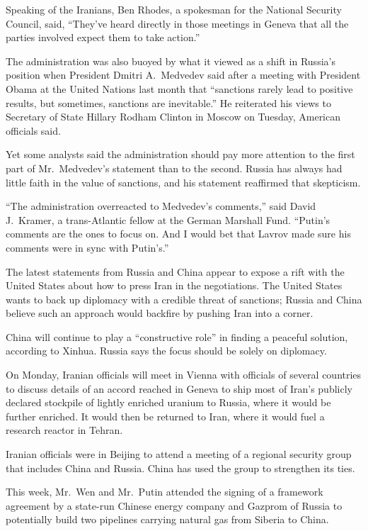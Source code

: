 ﻿\documentclass[12pt]{article}
\begin{document}
Speaking of the Iranians, Ben Rhodes, a spokesman for the National Security Council, said, ``They've
heard directly in those meetings in Geneva that all the parties involved expect them to take
action.''

The administration was also buoyed\cite{buoy} by what it viewed as a shift in Russia's position when
President Dmitri A.~Medvedev said after a meeting with President Obama at the United Nations last
month that ``sanctions rarely lead to positive results, but sometimes, sanctions are inevitable.''
He reiterated his views to Secretary of State Hillary Rodham Clinton in Moscow on Tuesday, American
officials said.

Yet some analysts said the administration should pay more attention to the first part of
Mr.~Medvedev's statement than to the second. Russia has always had little faith in the value of
sanctions, and his statement reaffirmed that skepticism.

``The administration overreacted to Medvedev's comments,'' said David J.~Kramer, a trans-Atlantic
fellow at the German Marshall Fund. ``Putin's comments are the ones to focus on. And I would bet
that Lavrov made sure his comments were in sync with Putin's.''

The latest statements from Russia and China appear to expose a rift\cite{rift} with the United
States about how to press Iran in the negotiations. The United States wants to back up diplomacy
with a credible threat of sanctions; Russia and China believe such an approach would backfire by
pushing Iran into a corner.

China will continue to play a ``constructive role'' in finding a peaceful solution, according to
Xinhua. Russia says the focus should be solely on diplomacy.

On Monday, Iranian officials will meet in Vienna with officials of several countries to discuss
details of an accord reached in Geneva to ship most of Iran's publicly declared stockpile of lightly
enriched uranium to Russia, where it would be further enriched. It would then be returned to Iran,
where it would fuel a research reactor in Tehran.

Iranian officials were in Beijing to attend a meeting of a regional security group that includes
China and Russia. China has used the group to strengthen its ties.

This week, Mr.~Wen and Mr.~Putin attended the signing of a framework agreement by a state-run
Chinese energy company and Gazprom of Russia to potentially build two pipelines carrying natural gas
from Siberia to China.
\end{document}
